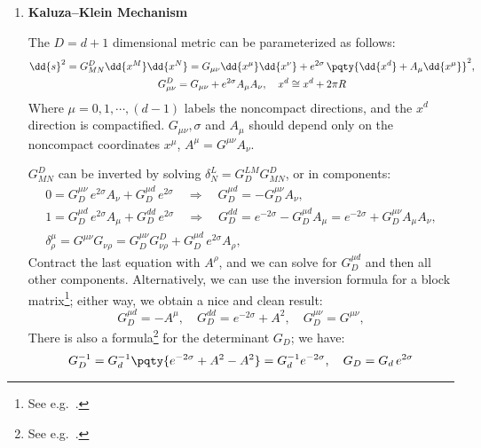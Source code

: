 \documentclass[a4paper,10pt]{article}
\begin{document}
\begin{enumerate}
\begin{enumerate}
	\end{enumerate}
	
	\item \textbf{Kaluza--Klein Mechanism}
	
	The $D = d+1$ dimensional metric can be parameterized as follows:
	\begin{gather}
		\dd{s}^2
		= G_{MN}^D \dd{x^M} \dd{x^N}
		= G_{\mu\nu} \dd{x^\mu} \dd{x^\nu}
			+ e^{2\sigma}\,\pqty{
				\dd{x^d} + A_\mu \dd{x^\mu}
			}^2,
	\label{eq:metric_decomp}
	\\
		G^D_{\mu\nu}
		= G_{\mu\nu} + e^{2\sigma} A_\mu A_\nu,\quad
		x^d \cong x^d + 2\pi R
	\label{eq:sub_metric_convention}
	\end{gather}
	Where $\mu = 0,1,\cdots,(d-1)$ labels the noncompact directions, and the $x^d$ direction is compactified. $G_{\mu\nu},\sigma$ and $A_\mu$ should depend only on the noncompact coordinates $x^\mu$, $A^\mu = G^{\mu\nu} A_\nu$. 
	
	$G_{MN}^D$ can be inverted by solving $
		\delta^L_N
		= G^{LM}_D G^D_{MN}
	$, or in components:
	\begin{gather}
		0 = G_D^{\mu\nu}\, e^{2\sigma} A_\nu
			+ G_D^{\mu d}\, e^{2\sigma}
	\quad\Longrightarrow\quad
		G_D^{\mu d}
		= - G_D^{\mu\nu} A_\nu,
	\\
		1 = G_D^{\mu d}\, e^{2\sigma} A_\mu
			+ G_D^{dd}\, e^{2\sigma}
	\quad\Longrightarrow\quad
		G_D^{dd}
		= e^{-2\sigma} - G_D^{\mu d} A_\mu
		= e^{-2\sigma} + G_D^{\mu\nu} A_\mu A_\nu,
	\\
		\delta^\mu_\rho
		= G^{\mu\nu} G_{\nu\rho}
		= G_D^{\mu\nu} G^D_{\nu\rho}
			+ G_D^{\mu d}\, e^{2\sigma} A_\rho,
	\end{gather}
	Contract the last equation with $A^\rho$, and we can solve for $G_D^{\mu d}$ and then all other components. 
	Alternatively, we can use the inversion formula for a block matrix\footnote{
		See e.g.~. 
	}; either way, we obtain a nice and clean result:
	\begin{equation}
		G_D^{\mu d}
		= -A^\mu,\quad
		G_D^{dd}
		= e^{-2\sigma} + A^2,\quad
		G_D^{\mu\nu}
		= G^{\mu\nu},
	\end{equation}
	There is also a formula\footnote{
		See e.g.~. 
	} for the determinant $G_D$; we have:
	\begin{equation}
		G_D^{-1}
		= G_d^{-1} \pqty{
				e^{-2\sigma}
				+ A^2 - A^2
			}
		= G_d^{-1} e^{-2\sigma},\quad
		G_D
		= G_d\, e^{2\sigma}
	\end{equation}
	

\end{enumerate}
\end{document}
